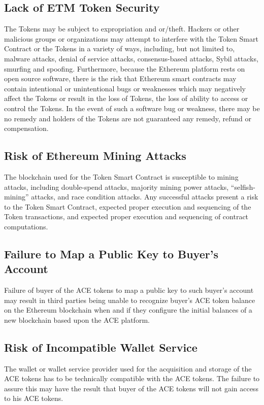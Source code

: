 \documentclass[12pt]{report}
\begin{document}
\subsection{Lack of ETM Token Security}
The Tokens may be subject to expropriation and or/theft. Hackers or other malicious groups or organizations may attempt to interfere with the Token Smart Contract or the Tokens in a variety of ways, including, but not limited to, malware attacks, denial of service attacks, consensus-based attacks, Sybil attacks, smurfing and spoofing.
Furthermore, because the Ethereum platform rests on open source software, there is the risk that Ethereum smart contracts may contain intentional or unintentional bugs or weaknesses which may negatively affect the Tokens or result in the loss of Tokens, the loss of ability to access or control the Tokens. In the event of such a software bug or weakness, there may be no remedy and holders of the Tokens are not guaranteed any remedy, refund or compensation.

\subsection{Risk of Ethereum Mining Attacks}
The blockchain used for the Token Smart Contract is susceptible to mining attacks, including double-spend attacks, majority mining power attacks, “selfish-mining” attacks, and race condition attacks. Any successful attacks present a risk to the Token Smart Contract, expected proper execution and sequencing of the Token transactions, and expected proper execution and sequencing of contract computations.

\subsection{Failure to Map a Public Key to Buyer’s Account}
Failure of buyer of the ACE tokens to map a public key to such buyer’s account may result in third parties being unable to recognize buyer’s ACE token balance on the Ethereum blockchain when and if they configure the initial balances of a new blockchain based upon the ACE platform.

\subsection{Risk of Incompatible Wallet Service}
The wallet or wallet service provider used for the acquisition and storage of the ACE tokens has to be technically compatible with the ACE tokens. The failure to assure this may have the result that buyer of the ACE tokens will not gain access to his ACE tokens.
\end{document}
